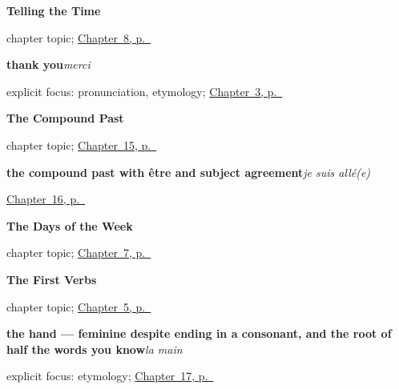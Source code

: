 \noindent\begin{minipage}[t]{\linewidth}
\raggedright
\textbf{Telling the Time}\par
\footnotesize chapter topic; \hyperref[ch:time]{Chapter~8, p.~\pageref*{ch:time}}
\end{minipage}\par\smallskip

\noindent\begin{minipage}[t]{\linewidth}
\raggedright
\textbf{thank you}\enspace\emph{merci}\par
\footnotesize explicit focus: pronunciation, etymology; \hyperref[ch:how-are-you]{Chapter~3, p.~\pageref*{ch:how-are-you}}
\end{minipage}\par\smallskip

\noindent\begin{minipage}[t]{\linewidth}
\raggedright
\textbf{The Compound Past}\par
\footnotesize chapter topic; \hyperref[ch:passe-compose]{Chapter~15, p.~\pageref*{ch:passe-compose}}
\end{minipage}\par\smallskip

\noindent\begin{minipage}[t]{\linewidth}
\raggedright
\textbf{the compound past with être and subject agreement}\enspace\emph{je suis allé(e)}\par
\footnotesize \hyperref[ch:etre]{Chapter~16, p.~\pageref*{ch:etre}}
\end{minipage}\par\smallskip

\noindent\begin{minipage}[t]{\linewidth}
\raggedright
\textbf{The Days of the Week}\par
\footnotesize chapter topic; \hyperref[ch:days]{Chapter~7, p.~\pageref*{ch:days}}
\end{minipage}\par\smallskip

\noindent\begin{minipage}[t]{\linewidth}
\raggedright
\textbf{The First Verbs}\par
\footnotesize chapter topic; \hyperref[ch:first-verbs]{Chapter~5, p.~\pageref*{ch:first-verbs}}
\end{minipage}\par\smallskip

\noindent\begin{minipage}[t]{\linewidth}
\raggedright
\textbf{the hand — feminine despite ending in a consonant, and the root of half the words you know}\enspace\emph{la main}\par
\footnotesize explicit focus: etymology; \hyperref[ch:fr-head-and-hand]{Chapter~17, p.~\pageref*{ch:fr-head-and-hand}}
\end{minipage}\par\smallskip

